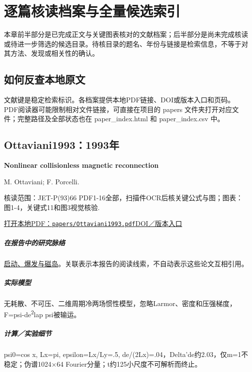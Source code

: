 \chapter{逐篇核读档案与全量候选索引}\label{ch:catalog}

本章前半部分是已完成正文与关键图表核对的文献档案；后半部分是尚未完成核读或待进一步筛选的候选目录。待核目录的题名、年份与链接是检索信息，不等于对其方法、发现或相关性的确认。

\section{如何反查本地原文}

文献键是稳定检索标识。各档案提供本地PDF链接、DOI或版本入口和页码。PDF阅读器可能限制相对文件链接，可直接在项目的 papers 文件夹打开对应文件；完整路径及全部状态也在 paper\_index.html 和 paper\_index.csv 中。

\section{Ottaviani1993：1993年}\label{paper:Ottaviani1993}

\textbf{Nonlinear collisionless magnetic reconnection}\citep{Ottaviani1993}\

M. Ottaviani;  F. Porcelli.

\textsf{核读范围：}JET-P(93)66 PDF1-16全部，扫描件OCR后核关键公式与图；\textsf{图表：}图1-4，关键式11和图3视觉核验.

\href{run:papers/Ottaviani1993.pdf}{打开本地PDF：\texttt{papers/Ottaviani1993.pdf}}\quad\href{https://doi.org/10.1103/PhysRevLett.71.3802}{DOI／版本入口}

\paragraph{在报告中的研究脉络}\hyperref[story:onset]{启动、爆发与磁岛}。关联表示本报告的阅读线索，不自动表示这些论文互相引用。

\paragraph{实际模型}无耗散、不可压、二维周期冷两场惯性模型，忽略Larmor、密度和压强梯度，F=psi-de\textsuperscript{2}lap psi被输运。

\paragraph{计算／实验细节}psi0=cos x, Lx=pi, epsilon=Lx/Ly=.5, de/(2Lx)=.04，Delta'de约2.03，仅m=1不稳定；伪谱1024×64 Fourier分量；t约125小尺度不可解析而终止。

